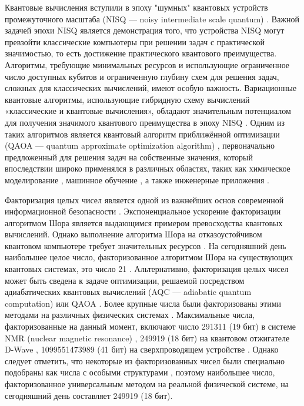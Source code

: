 
Квантовые вычисления вступили в эпоху "шумных" квантовых устройств
промежуточного масштаба (NISQ --- noisy intermediate scale quantum) \cite{cite_1,
cite_2}. Важной задачей эпохи NISQ является демонстрация того, что устройства
NISQ могут превзойти классические компьютеры при решении задач с практической
значимостью, то есть достижение практического квантового преимущества.
Алгоритмы, требующие минимальных ресурсов и использующие ограниченное число
доступных кубитов и ограниченную глубину схем для решения задач, сложных для
классических вычислений, имеют особую важность. Вариационные квантовые
алгоритмы, использующие гибридную схему вычислений «классические и квантовые
вычисления», обладают значительным потенциалом для получения значимого
квантового преимущества в эпоху NISQ \cite{cite_3, cite_4, cite_2, cite_5,
cite_6}. Одним из таких алгоритмов является квантовый алгоритм приближённой
оптимизации (QAOA --- quantum approximate optimization algorithm) \cite{cite_5},
первоначально предложенный для решения задач на собственные значения, который
впоследствии широко применялся в различных областях, таких как химическое
моделирование \cite{cite_7, cite_8}, машинное обучение \cite{cite_9}, а также
инженерные приложения \cite{cite_10, cite_11}.

Факторизация целых чисел является одной из важнейших основ современной
информационной безопасности \cite{cite_12}. Экспоненциальное ускорение
факторизации алгоритмом Шора \cite{cite_13} является выдающимся примером
превосходства квантовых вычислений. Однако выполнение алгоритма Шора на
отказоустойчивом квантовом компьютере требует значительных ресурсов
\cite{cite_14, cite_15}. На сегодняшний день наибольшее целое число,
факторизованное алгоритмом Шора на существующих квантовых системах, это число
21 \cite{cite_16, cite_17, cite_18}. Альтернативно, факторизация целых чисел
может быть сведена к задаче оптимизации, решаемой посредством адиабатических
квантовых вычислений (AQC --- adiabatic quantum computation) \cite{cite_19,
cite_20, cite_21, cite_22} или QAOA \cite{cite_23}. Более крупные числа были
факторизованы этими методами на различных физических системах \cite{cite_24,
cite_25, cite_26, cite_27}. Максимальные числа, факторизованные на данный
момент, включают число 291311 (19 бит) в системе NMR (nuclear magnetic
resonance) \cite{cite_26}, 249919 (18 бит) на квантовом отжигателе D-Wave
\cite{cite_25}, 1099551473989 (41 бит) на сверхпроводящем устройстве
\cite{cite_27}. Однако следует отметить, что некоторые из факторизованных чисел
были специально подобраны как числа с особыми структурами \cite{cite_28},
поэтому наибольшее число, факторизованное универсальным методом на реальной
физической системе, на сегодняшний день составляет 249919 (18 бит).

